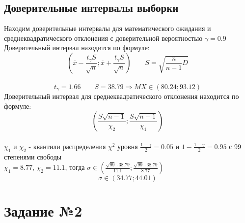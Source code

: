 \documentclass[12pt,a4paper]{report}
\begin{document}
\subsection*{Доверительные интервалы выборки}
Находим доверительные интервалы для математического ожидания и
среднеквадратического отклонения с доверительной вероятностью $\gamma=0.9$\\
\hfill\break
Доверительный интервал находится по формуле:
$$(\overline{x}-\frac{t_\gamma S}{\sqrt{n}}; \overline{x}+\frac{t_\gamma S}{\sqrt{n}})\qquad S=\sqrt{\frac{n}{n-1}D}$$ \\
$$t_\gamma=1.66\qquad S=38.79\Rightarrow MX\in(80.24; 93.12)$$
Доверительный интервал для среднеквадратического отклонения находится по формуле:
$$(\frac{S\sqrt{n-1}}{\chi_2}; \frac{S\sqrt{n-1}}{\chi_1})$$\\
\hfill\break
$\chi_1$ и $\chi_2$ - квантили распределения $\chi^2$ уровня $\frac{1-\gamma}{2}=0.05$ и $1-\frac{1-\gamma}{2}=0.95$ с 99 степенями свободы\\
\hfill\break
$\chi_1=8.77$, $\chi_2=11.1$, тогда $\sigma \in (\frac{\sqrt{99}\cdot38.79}{11.1}; \frac{\sqrt{99}\cdot38.79}{8.77})$
$$\sigma\in(34.77;44.01)$$
\section*{Задание №2}
\end{document}
